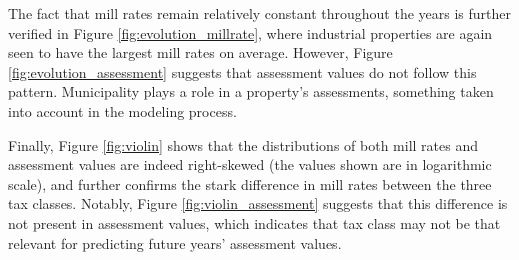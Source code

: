 \documentclass{article}
\begin{document}
The fact that mill rates remain relatively constant throughout the years is further verified in Figure \ref{fig:evolution_millrate}, where industrial properties are again seen to have the largest mill rates on average. However, Figure \ref{fig:evolution_assessment} suggests that assessment values do not follow this pattern. Municipality plays a role in a property's assessments, something taken into account in the modeling process.



Finally, Figure \ref{fig:violin} shows that the distributions of both mill rates and assessment values are indeed right-skewed (the values shown are in logarithmic scale), and further confirms the stark difference in mill rates between the three tax classes. Notably, Figure \ref{fig:violin_assessment} suggests that this difference is not present in assessment values, which indicates that tax class may not be that relevant for predicting future years' assessment values.
\end{document}
